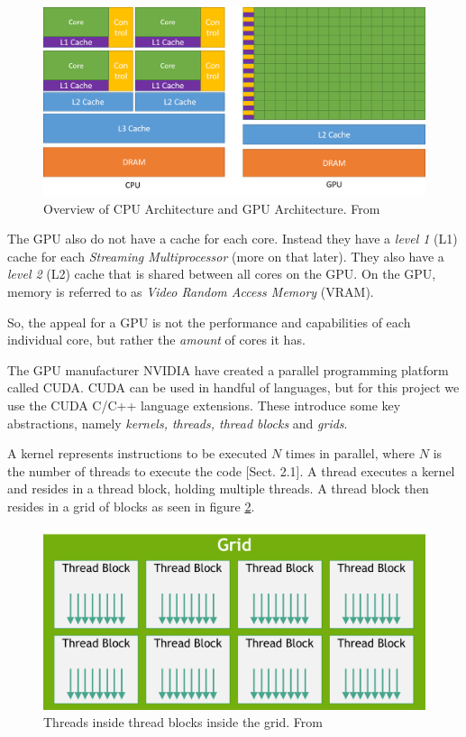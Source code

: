 \begin{figure}[ht]
\includegraphics[width=\textwidth]{Documents/Report/Figures/CPU vs GPU .png}
\caption{Overview of CPU Architecture and GPU Architecture. From \cite{nvidia:cudadoc}}
\label{fig:cpu_vs_gpu}
\end{figure}

The GPU also do not have a cache for each core. Instead they have a \textit{level 1} (L1) cache for each \textit{Streaming Multiprocessor} (more on that later). They also have a \textit{level 2} (L2) cache that is shared between all cores on the GPU. On the GPU, memory is referred to as \textit{Video Random Access Memory} (VRAM).

So, the appeal for a GPU is not the performance and capabilities of each individual core, but rather the \textit{amount} of cores it has.

\noindent The GPU manufacturer NVIDIA have created a parallel programming platform called CUDA. CUDA can be used in handful of languages, but for this project we use the CUDA C/C++ language extensions. These introduce some key abstractions, namely \textit{kernels, threads, thread blocks} and \textit{grids}. 

A kernel represents instructions to be executed $N$ times in parallel, where $N$ is the number of threads to execute the code [Sect. 2.1]\cite{nvidia:cudadoc}. A thread executes a kernel and resides in a thread block, holding multiple threads. A thread block then resides in a grid of blocks as seen in figure \ref{fig:threads and blocks}.

\begin{figure}[ht]
\includegraphics[width=\textwidth]{Documents/Report/Figures/Threads and blocks.png}
\caption{Threads inside thread blocks inside the grid. From \cite{nvidia:cudadoc}}
\label{fig:threads and blocks}
\end{figure}

